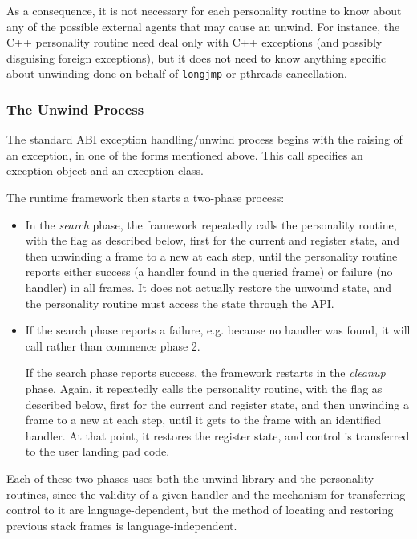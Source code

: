 As a consequence, it is not necessary for each personality routine to know
about any of the possible external agents that may cause an unwind. For
instance, the C++ personality routine need deal only with C++ exceptions
(and possibly disguising foreign exceptions), but it does not need to know
anything specific about unwinding done on behalf of \texttt{longjmp} or
pthreads cancellation.

\subsubsection{The Unwind Process}

The standard ABI exception handling/unwind process begins with the raising
of an exception, in one of the forms mentioned above. This call specifies an
exception object and an exception class.

The runtime framework then starts a two-phase process:
\begin{itemize}
\item In the \emph{search} phase, the framework repeatedly calls the
personality routine, with the  flag as
described below, first for the current \EIP and register state, and then
unwinding a frame to a new \EIP at each step, until the personality
routine reports either success (a handler found in the queried frame)
or failure (no handler) in all frames. It does not actually restore the
unwound state, and the personality routine must access the state through
the API.

\item If the search phase reports a failure, e.g. because no handler was
found, it will call  rather than commence phase 2.

\begin{sloppypar}
If the search phase reports success, the framework restarts in the
\emph{cleanup} phase. Again, it repeatedly calls the personality
routine, with the  flag as described
below, first for the current \EIP and register state, and then unwinding
a frame to a new \EIP at each step, until it gets to the frame with
an identified handler. At that point, it restores the register state,
and control is transferred to the user landing pad code.
\end{sloppypar}
\end {itemize}

Each of these two phases uses both the unwind library and the personality
routines, since the validity of a given handler and the mechanism for
transferring control to it are language-dependent, but the method of
locating and restoring previous stack frames is language-independent.

